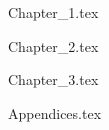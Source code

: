 \documentclass[a4paper,oneside]{book}
\begin{document}
 {Chapter_1.tex}

 {Chapter_2.tex}

 {Chapter_3.tex}

%

 {Appendices.tex}
\end{document}
